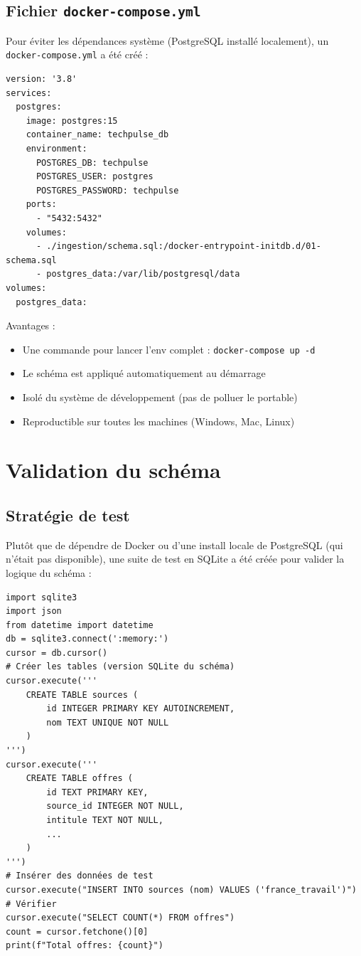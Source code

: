 \documentclass[12pt, a4paper]{article}
\begin{document}
\subsection{Fichier \texttt{docker-compose.yml}}
Pour éviter les dépendances système (PostgreSQL installé localement), un \texttt{docker-compose.yml} a été créé :
\begin{lstlisting}[style=yaml]
version: '3.8'
services:
  postgres:
    image: postgres:15
    container_name: techpulse_db
    environment:
      POSTGRES_DB: techpulse
      POSTGRES_USER: postgres
      POSTGRES_PASSWORD: techpulse
    ports:
      - "5432:5432"
    volumes:
      - ./ingestion/schema.sql:/docker-entrypoint-initdb.d/01-schema.sql
      - postgres_data:/var/lib/postgresql/data
volumes:
  postgres_data:
\end{lstlisting}
Avantages :
\begin{itemize}
    \item Une commande pour lancer l'env complet : \texttt{docker-compose up -d}
    \item Le schéma est appliqué automatiquement au démarrage
    \item Isolé du système de développement (pas de polluer le portable)
    \item Reproductible sur toutes les machines (Windows, Mac, Linux)
\end{itemize}
\section{Validation du schéma}
\subsection{Stratégie de test}
Plutôt que de dépendre de Docker ou d'une install locale de PostgreSQL (qui n'était pas disponible), une suite de test en SQLite a été créée pour valider la logique du schéma :
\begin{lstlisting}[style=python]
import sqlite3
import json
from datetime import datetime
db = sqlite3.connect(':memory:')
cursor = db.cursor()
# Créer les tables (version SQLite du schéma)
cursor.execute('''
    CREATE TABLE sources (
        id INTEGER PRIMARY KEY AUTOINCREMENT,
        nom TEXT UNIQUE NOT NULL
    )
''')
cursor.execute('''
    CREATE TABLE offres (
        id TEXT PRIMARY KEY,
        source_id INTEGER NOT NULL,
        intitule TEXT NOT NULL,
        ...
    )
''')
# Insérer des données de test
cursor.execute("INSERT INTO sources (nom) VALUES ('france_travail')")
# Vérifier
cursor.execute("SELECT COUNT(*) FROM offres")
count = cursor.fetchone()[0]
print(f"Total offres: {count}")
\end{lstlisting}
\end{document}
